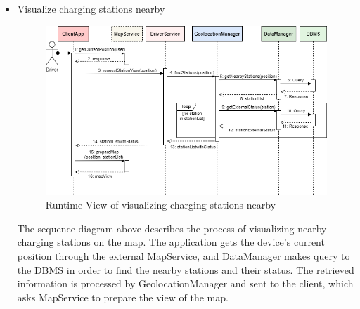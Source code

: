 \documentclass[../main.tex]{subfiles}
\begin{document}
\begin{itemize}
    \newpage
    \item Visualize charging stations nearby
    {
    \vspace{2em}
    \begin{figure}[H]
    \centering
    \includegraphics[width=\textwidth]{runtimeview/rv_visualizeStations.png}
    \caption{Runtime View of visualizing charging stations nearby}
    \label{fig:rv_visualize}
    \end{figure}}
    The sequence diagram above describes the process of visualizing nearby charging stations on the map. The application gets the device's current position through the external MapService, and DataManager makes query to the DBMS in order to find the nearby stations and their status. The retrieved information is processed by GeolocationManager and sent to the client, which asks MapService to prepare the view of the map.


\end{itemize}
\end{document}
